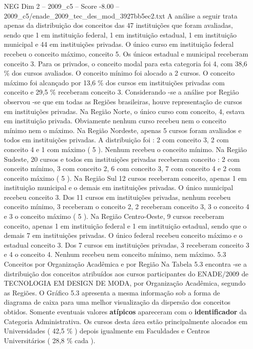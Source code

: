 \begin{textsample}{NEG Dim 2 – 2009\_c5 – Score -8.00 – 2009\_c5/enade\_2009\_tec\_des\_mod\_3927bb5ec2.txt}
A análise a seguir trata apenas da distribuição dos conceitos das 47 instituições que foram avaliadas, sendo que 1 em instituição federal, 1 em instituição estadual, 1 em instituição municipal e 44 em instituições privadas.
O único curso em instituição federal recebeu o conceito máximo, conceito 5.
Os únicos estadual e municipal receberam conceito 3.
Para os privados, o conceito modal para esta categoria foi 4, com 38,6 \% dos cursos avaliados.
O conceito mínimo foi alocado a 2 cursos.
O conceito máximo foi alcançado por 13,6 \% dos cursos em instituições privadas com conceito e 29,5 \% receberam conceito 3.
Considerando -se a análise por Região observou -se que em todas as Regiões brasileiras, houve representação de cursos em instituições privadas.
Na Região Norte, o único curso com conceito, 4, estava em instituição privada.
Obviamente nenhum curso recebeu nem o conceito mínimo nem o máximo.
Na Região Nordeste, apenas 5 cursos foram avaliados e todos em instituições privadas.
A distribuição foi : 2 com conceito 3, 2 com conceito 4 e 1 com máximo ( 5 ).
Nenhum recebeu o conceito mínimo.
Na Região Sudeste, 20 cursos e todos em instituições privadas receberam conceito : 2 com conceito mínimo, 3 com conceito 2, 6 com conceito 3, 7 com conceito 4 e 2 com conceito máximo ( 5 ).
Na Região Sul 12 cursos receberam conceito, apenas 1 em instituição municipal e o demais em instituições privadas.
O único municipal recebeu conceito 3.
Dos 11 cursos em instituições privadas, nenhum recebeu conceito mínimo, 3 receberam o conceito 2, 2 receberam conceito 3, 3 o conceito 4 e 3 o conceito máximo ( 5 ).
Na Região Centro-Oeste, 9 cursos receberam conceito, apenas 1 em instituição federal e 1 em instituição estadual, sendo que o demais 7 em instituições privadas.
O único federal recebeu conceito máximo e o estadual conceito 3.
Dos 7 cursos em instituições privadas, 3 receberam conceito 3 e 4 o conceito 4.
Nenhum recebeu nem conceito mínimo, nem máximo. 5.3 Conceitos por Organização Acadêmica e por Região Na Tabela 5.3 encontra -se a distribuição dos conceitos atribuídos aos cursos participantes do ENADE/2009 de TECNOLOGIA EM DESIGN DE MODA, por Organização Acadêmica, segundo as Regiões.
O Gráfico 5.3 apresenta a mesma informação sob a forma de diagrama de caixa para uma melhor visualização da dispersão dos conceitos obtidos.
Somente eventuais valores \textbf{atípicos} apareceram com o \textbf{identificador} da Categoria Administrativa.
Os cursos desta área estão principalmente alocados em Universidades ( 42,5 \% ) depois igualmente em Faculdades e Centros Universitários ( 28,8 \% cada ).

\end{textsample}

